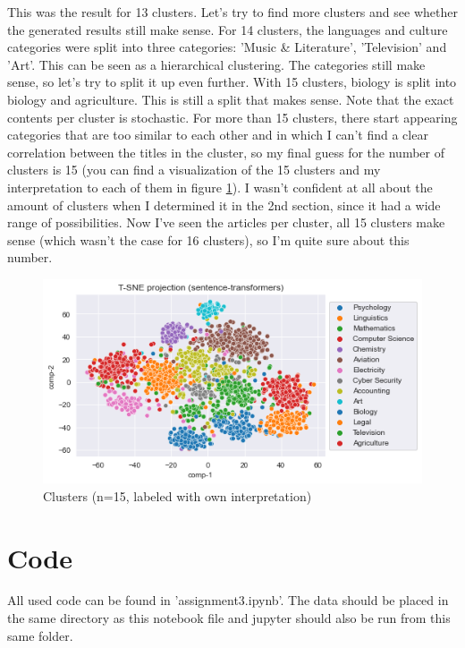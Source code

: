 \documentclass{article}
\begin{document}
This was the result for 13 clusters. Let's try to find more clusters and see whether the generated results still make sense. For 14 clusters, the languages and culture categories were split into three categories: 'Music \& Literature', 'Television' and 'Art'. This can be seen as a hierarchical clustering. The categories still make sense, so let's try to split it up even further. With 15 clusters, biology is split into biology and agriculture. This is still a split that makes sense. Note that the exact contents per cluster is stochastic. For more than 15 clusters, there start appearing categories that are too similar to each other and in which I can't find a clear correlation between the titles in the cluster, so my final guess for the number of clusters is 15 (you can find a visualization of the 15 clusters and my interpretation to each of them in figure  \ref{fig:clusters15}). I wasn't confident at all about the amount of clusters when I determined it in the 2nd section, since it had a wide range of possibilities. Now I've seen the articles per cluster, all 15 clusters make sense (which wasn't the case for 16 clusters), so I'm quite sure about this number.

\begin{figure}[h!]
\centering
\includegraphics[width=150mm]{clusters-labeled-15.png}
\caption{Clusters (n=15, labeled with own interpretation)}
\label{fig:clusters15}
\end{figure}

\section{Code}
All used code can be found in 'assignment3.ipynb'. The data should be placed in the same directory as this notebook file and jupyter should also be run from this same folder.
\end{document}
